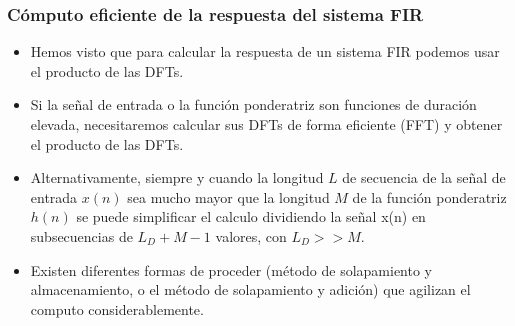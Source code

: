 \begin{frame}
\frametitle{Cómputo eficiente de la respuesta del sistema FIR}

\footnotesize

\begin{itemize}
\item Hemos visto que para calcular la respuesta de un sistema FIR podemos usar el producto de las DFTs.
\item Si la señal de entrada o la función ponderatriz son funciones de duración elevada, necesitaremos calcular sus DFTs de forma eficiente (FFT) y obtener el producto de las DFTs.
\item Alternativamente, siempre y cuando la longitud $L$ de secuencia de la señal de entrada $x(n)$ sea mucho mayor que la longitud $M$ de la función ponderatriz $h(n)$ se puede simplificar el calculo dividiendo la señal x(n) en subsecuencias de $L_D+M-1$ valores, con $L_D>>M$.

\item Existen diferentes formas de proceder (método de solapamiento y almacenamiento, o el método de solapamiento y adición) que agilizan el computo considerablemente.
\end{itemize}

\end{frame}


